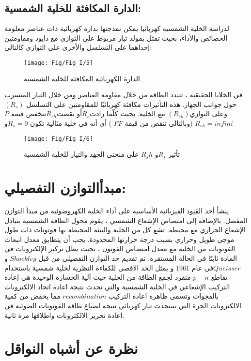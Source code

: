 \subsection{الدارة المكافئة للخلية الشمسية:}
لدراسة الخلية الشمسية كهربائيا يمكن نمذجتها بدارة كهربائية ذات عناصر معلومة الخصائص والأداء، بحيث تمثل بمولد تيار مربوط على التوازي مع دايود ومقاومتين إحداهما على التسلسل والأخرى على التوازي كالتالي: 
\begin{figure}[h!]
	\centering
	\texttt{[image: Fig/Fig\_I/5]}
	\caption{الدارة الكهربائية المكافئة للخلية الشمسية}
	\label{fig:5}
\end{figure}
\FloatBarrier
في الخلايا الحقيقية ، تتبدد الطاقة من خلال مقاومة العناصر ومن خلال التيار المتسرب حول جوانب الجهاز. هذه التأثيرات مكافئة كهربائيًا للمقاومتين على التسلسل $ (R_s) $ وعلى التوازي$ (R_{sh}) $ مع الخلية. بحيث كلّما زادت$  R_s  $أو نقصت$ R_{sh} $تنخفض قيمة $ P  $(وبالتالي تنقص من قيمة $ FF $ ) أي أنه في خلية مثالية تكون $ R_s=0  $و  $ R_{sh}=infini $
\begin{figure}[h!]
	\centering
	\texttt{[image: Fig/Fig\_I/6]}
	\caption{تأثير $ R_s $و $ R_sh $ على منحنى الجهد والتيار للخلية الشمسية}
	\label{fig:fig6}
\end{figure}
\FloatBarrier
\section{مبدأالتوازن التفصيلي:}
ينشأ أحد القيود الفيزيائية الأساسية على أداء الخلية الكهروضوئية من مبدأ التوازن المفصل. بالإضافة إلى امتصاص الإشعاع الشمسي ، يقوم محول الطاقة الشمسية بتبادل الإشعاع الحراري مع محيطه. تشع كل من الخلية والبيئة المحيطة بها فوتونات ذات طول موجي طويل وحراري بسبب درجة حرارتها المحدودة. يجب أن يتطابق معدل انبعاث الفوتونات من الخلية مع معدل امتصاص الفوتون ، بحيث يظل تركيز الإلكترونات في المادة ثابتًا في الحالة المستقرة. 
تم تقديم حد التوازن التفصيلي من قبل $   Shockley $ و $ Queisser  $في عام 1961 و يمثل الحد الأقصى للكفاءة النظرية لخلية شمسية باستخدام تقاطع $  p-n $ منفرد لجمع الطاقة من الخلية حيث آلية الخسارة الوحيدة هي إعادة التركيب الإشعاعي في الخلية الشمسية والتي تحدث نتيجة اعادة اتحاد الالكترونات بالفجوات وتسمى ظاهرة اعادة التركيب $ recombination $ مما يخفض من كمية الالكترونات الحرة التي ستحدث تيار كهربائي نتيجة لضياع طاقة الفوتونات الضوئية في اعادة تحرير الالكترونات واطلاقها مرة ثانية.

\section{نظرة عن أشباه النواقل}

